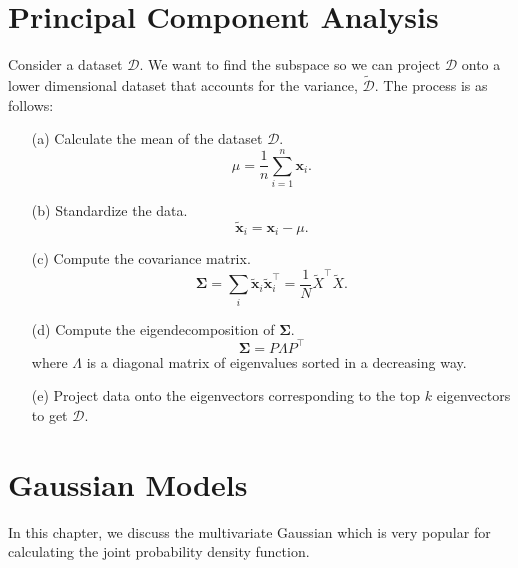 \documentclass{article}
\begin{document}
\section{Principal Component Analysis}
Consider a dataset $\mathcal{D}$. We want to find the subspace so we can project $\mathcal{D}$
onto a lower dimensional dataset that accounts for the variance, $\tilde{\mathcal{D}}$.
The process is as follows:
\begin{enumerate}
\item[(a)] Calculate the mean of the dataset $\mathcal{D}$.
  \[
  \mu = \frac{1}{n}\sum_{i=1}^{n}\mathbf{x}_i.
  \]
\item[(b)] Standardize the data.
  \[
  \tilde{\mathbf{x}}_i = \mathbf{x}_i - \mu.
  \]
\item[(c)] Compute the covariance matrix.
  \[
  \mathbf{\Sigma} = \sum_{i}\tilde{\mathbf{x}}_i\tilde{\mathbf{x}}_i^\top = \frac{1}{N}\tilde{X}^\top \tilde{X}.
  \]
\item[(d)] Compute the eigendecomposition of $\mathbf{\Sigma}$.
  \[
  \mathbf{\Sigma} = P\Lambda P^\top
  \]
  where $\Lambda$ is a diagonal matrix of eigenvalues sorted in a decreasing way.
  \item[(e)] Project data onto the eigenvectors corresponding to the top $k$ eigenvectors to get $\mathcal{D}$.
\end{enumerate}


\section{Gaussian Models}
In this chapter, we discuss the multivariate Gaussian which is very popular for calculating the joint probability density function.
\end{document}
